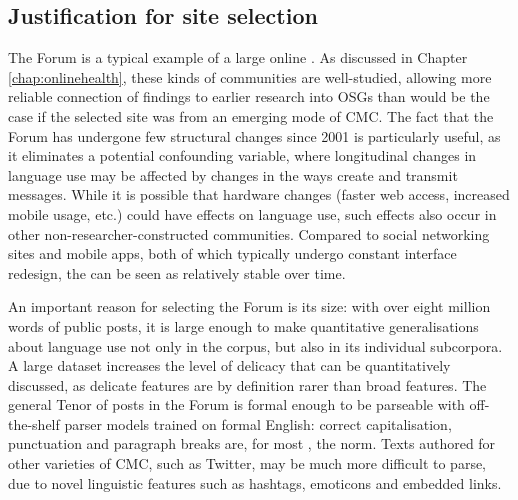 \subsection{Justification for site selection}

The \gls{Forum} is a typical example of a large online . As discussed in Chapter \ref{chap:onlinehealth}, these kinds of communities are well\hyp{}studied, allowing more reliable connection of findings to earlier research into \glspl{OSG} than would be the case if the selected site was from an emerging \gls{mode} of \gls{CMC}. The fact that the \gls{Forum} has undergone few structural changes since 2001 is particularly useful, as it eliminates a potential confounding variable, where longitudinal changes in language use may be affected by changes in the ways  create and transmit messages. While it is possible that hardware changes (faster web access, increased mobile usage, etc.) could have effects on language use, such effects also occur in other non\hyp{}researcher\hyp{}constructed communities. Compared to social networking sites and mobile apps, both of which typically undergo constant interface redesign, the  can be seen as relatively stable over time.

An important reason for selecting the \gls{Forum} is its size: with over eight million words of public \glspl{post}, it is large enough to make quantitative generalisations about language use not only in the \gls{corpus}, but also in its individual subcorpora. A large dataset increases the level of delicacy that can be quantitatively discussed, as delicate features are by definition rarer than broad features. The general Tenor of \glspl{post} in the \gls{Forum} is formal enough to be parseable with off\hyp{}the\hyp{}shelf parser models trained on formal English: correct capitalisation, punctuation and paragraph breaks are, for most , the norm. Texts authored for other varieties of \gls{CMC}, such as Twitter, may be much more difficult to parse, due to novel linguistic features such as hashtags, emoticons and embedded links.

